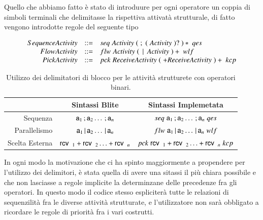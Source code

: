 Quello che abbiamo fatto è stato di introduure per ogni operatore un coppia di
simboli terminali che delimitasse la rispettiva attivatà
strutturale, di fatto vengono introdotte regole del seguente tipo

$$
\begin{array}{rcl}
SequenceActivity &	::= &	seq \; Activity \; ( \; ; \; ( \; Activity  \;)?  \;
)* \; qes \\ 
FlowActivity &	::=  &	flw \; Activity \; ( \; \,|\, \; Activity \; )+ \; wlf \\
PickActivity &	::=  &	pck \; ReceiveActivity \; ( \; + ReceiveActivity
 \;)+ \; kcp \\
\end{array}
$$

\begin{table}
\begin{center}
\begin{tabular}{|r|c|c|}
\hline
 & Sintassi Blite & Sintassi Implemetata \\
\hline
Sequenza & ${\sf a}_1 \, ; {\sf a}_2 \ldots \, ; {\sf a}_n $ & $seq \; {\sf a}_1 \, ;
{\sf a}_2 \ldots \, ; {\sf a}_n \; qes$ \\
\hline
Parallelismo & ${\sf a}_1 \,|\, {\sf a}_2 \ldots \,|\, {\sf a}_n $ & $flw \; {\sf a}_1 \,|\,
{\sf a}_2 \ldots \,|\, {\sf a}_n \; wlf$ \\
\hline
Scelta Esterna & ${\sf rcv}\,\, \,_1 + {\sf rcv}\,\, \,_2
\ldots + {\sf rcv}\,\, \,_n $ & $pck \; {\sf rcv}\,\, \,_1 + 
{\sf rcv}\,\, \,_2 \ldots + {\sf rcv}\,\, \,_n \; kcp$ \\
\hline
\end{tabular}
\caption{Utilizzo dei delimitatori di blocco per le attività strutturete con
operatori binari.}
\label{tab:blokmarks}
\end{center}
\end{table}

In ogni modo la motivazione che ci ha spinto maggiormente a propendere per
l'utilizzo dei delimitori, è stata quella di avere una sitassi il più chiara
possibile e che non lasciasse a regole implicite la determinzane delle precedenze
fra gli operatori. In questo modo il codice stesso espliciterà tutte le
relazioni di sequenzilità fra le diverse attività strutturate, e l'utilizzatore non sarà
obbligato a ricordare le regole di priorità fra i vari costrutti.


